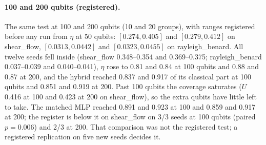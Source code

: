 \documentclass{article}
\begin{document}
\paragraph{100 and 200 qubits (registered).} The same test at 100 and 200 qubits (10 and 20 groups), with ranges
registered before any run from $\eta$ at 50 qubits: $[0.274, 0.405]$ and $[0.279, 0.412]$ on shear\_flow, $[0.0313,
0.0442]$ and $[0.0323, 0.0455]$ on rayleigh\_benard. All twelve seeds fell inside (shear\_flow 0.348--0.354 and
0.369--0.375; rayleigh\_benard 0.037--0.039 and 0.040--0.041), $\eta$ rose to 0.81 and 0.84 at 100 qubits and 0.88
and 0.87 at 200, and the hybrid reached 0.837 and 0.917 of its classical part at 100 qubits and 0.851 and 0.919 at 200.
Past 100 qubits the coverage saturates ($U$ 0.416 at 100 and 0.423 at 200 on shear\_flow), so the extra qubits have
little left to take. The matched MLP reached 0.891 and 0.923 at 100 and 0.859 and 0.917 at 200; the register is below
it on shear\_flow on 3/3 seeds at 100 qubits (paired $p=0.006$) and 2/3 at 200. That comparison was not the registered
test; a registered replication on five new seeds decides it.
\end{document}
